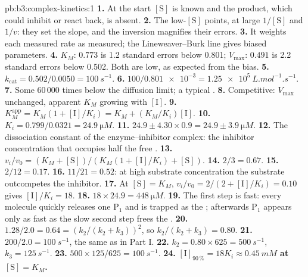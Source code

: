 \begin{solution}{pb:b3:complex-kinetics:1}
\textbf{1.} At the start $[\mathrm S]$ is known and the product, which could inhibit or react
back, is absent.
\textbf{2.} The low-$[\mathrm S]$ points, at large $1/[\mathrm S]$ and $1/v$: they set the slope, and the
inversion magnifies their errors.
\textbf{3.} It weights each measured rate as measured; the Lineweaver--Burk line gives
biased parameters.
\textbf{4.} $K_M$: $0.773$ is 1.2 standard errors below 0.801; $V_{\max}$: $0.491$ is 2.2 standard
errors below 0.502. Both are low, as expected from the bias.
\textbf{5.} $k_{\mathrm{cat}} = 0.502/0.0050 = \qty{100}{s^{-1}}$.
\textbf{6.} $100/\num{0.801e-3} = \qty{1.25e5}{L.mol^{-1}.s^{-1}}$.
\textbf{7.} Some 60\,000 times below the diffusion limit; a typical .
\textbf{8.} Competitive: $V_{\max}$ unchanged, apparent $K_M$ growing with $[\mathrm I]$.
\textbf{9.} $K_M^{\mathrm{app}} = K_M(1 + [\mathrm I]/K_i) = K_M + (K_M/K_i)[\mathrm I]$.
\textbf{10.} $K_i = 0.799/0.0321 = \qty{24.9}{\micro M}$.
\textbf{11.} $24.9 \pm 4.30 \times 0.9 = 24.9 \pm \qty{3.9}{\micro M}$.
\textbf{12.} The dissociation constant of the enzyme--inhibitor complex: the
inhibitor concentration that occupies half the free .
\textbf{13.} $v_i/v_0 = (K_M + [\mathrm S])/(K_M(1 + [\mathrm I]/K_i) + [\mathrm S])$.
\textbf{14.} $2/3 = 0.67$.
\textbf{15.} $2/12 = 0.17$.
\textbf{16.} $11/21 = 0.52$: at high substrate concentration the substrate outcompetes
the inhibitor.
\textbf{17.} At $[\mathrm S] = K_M$, $v_i/v_0 = 2/(2 + [\mathrm I]/K_i) = 0.10$ gives $[\mathrm I]/K_i = 18$.
\textbf{18.} $18 \times 24.9 = \qty{448}{\micro M}$.
\textbf{19.} The first step is fast: every  molecule quickly releases one $\mathrm P_1$
and is trapped as the ; afterwards $\mathrm P_1$ appears only as fast as the slow
second step frees the .
\textbf{20.} $1.28/2.0 = 0.64 = (k_2/(k_2 + k_3))^2$, so $k_2/(k_2 + k_3) = 0.80$.
\textbf{21.} $200/2.0 = \qty{100}{s^{-1}}$, the same as in Part I.
\textbf{22.} $k_2 = 0.80 \times 625 = \qty{500}{s^{-1}}$, $k_3 = \qty{125}{s^{-1}}$.
\textbf{23.} $500 \times 125/625 = \qty{100}{s^{-1}}$.
\textbf{24.} \textbf{$[\mathrm I]_{90\,\%} = 18K_i \approx \qty{0.45}{mM}$ at $[\mathrm S] = K_M$.}
\end{solution}
